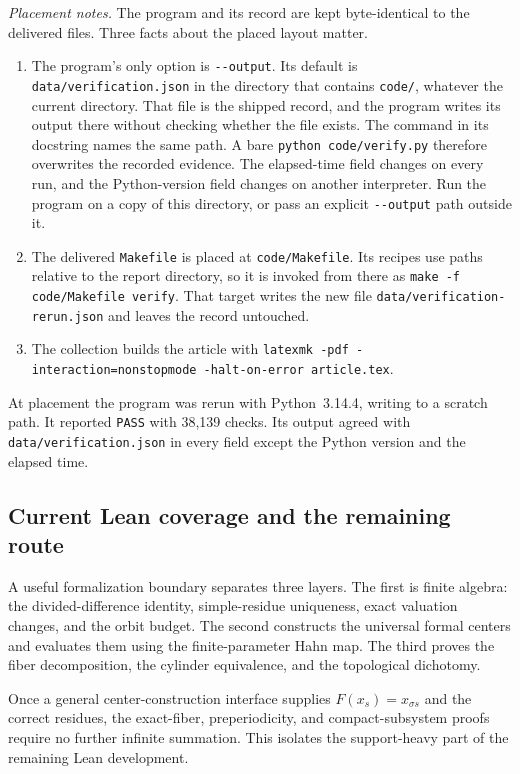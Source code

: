 \documentclass[11pt,a4paper]{article}
\numberwithin{equation}{section}
\theoremstyle{plain}
\theoremstyle{definition}
\theoremstyle{remark}
\newcommand{\sh}{\sigma}
\begin{document}
\emph{Placement notes.} The program and its record are kept byte-identical
to the delivered files. Three facts about the placed layout matter.
\begin{enumerate}[label=\textup{(\roman*)},leftmargin=2em]
\item The program's only option is \texttt{-{}-output}. Its default is
\texttt{data/verification.json} in the directory that contains
\texttt{code/}, whatever the current directory. That file is the shipped
record, and the program writes its output there without checking whether
the file exists. The command in its docstring names the same path. A bare
\texttt{python code/verify.py} therefore overwrites the recorded evidence.
The elapsed-time field changes on every run, and the Python-version field
changes on another interpreter. Run the program on a copy of this
directory, or pass an explicit \texttt{-{}-output} path outside it.
\item The delivered \texttt{Makefile} is placed at \texttt{code/Makefile}.
Its recipes use paths relative to the report directory, so it is invoked
from there as \texttt{make -f code/Makefile verify}. That target writes
the new file \texttt{data/verification-rerun.json} and leaves the record
untouched.
\item The collection builds the article with
\texttt{latexmk -pdf -interaction=nonstopmode -halt-on-error article.tex}.
\end{enumerate}
At placement the program was rerun with Python~3.14.4, writing to a scratch
path. It reported \texttt{PASS} with 38,139 checks. Its output agreed with
\texttt{data/verification.json} in every field except the Python version
and the elapsed time.

\subsection{Current Lean coverage and the remaining route}
\label{epd:subsec:formalization}
A useful formalization boundary separates three layers. The first is
finite algebra: the divided-difference identity, simple-residue
uniqueness, exact valuation changes, and the orbit budget. The second
constructs the universal formal centers and evaluates them using the
finite-parameter Hahn map. The third proves the fiber decomposition,
the cylinder equivalence, and the topological dichotomy.

Once a general center-construction interface supplies
$F(x_s)=x_{\sh s}$ and the correct residues, the exact-fiber,
preperiodicity, and compact-subsystem proofs require no further
infinite summation. This isolates the support-heavy part of the remaining
Lean development.
\end{document}
